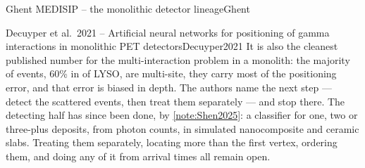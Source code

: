 \begin{programnote}{Ghent MEDISIP -- the monolithic detector lineage}{Ghent}
\begin{papernote}{Decuyper et al.\ 2021 -- Artificial neural networks for positioning of gamma interactions in monolithic PET detectors}{Decuyper2021}
It is also the cleanest published number for the multi-interaction problem in
a monolith: the majority of events, 60\% in  of LYSO, are
multi-site, they carry most of the positioning error, and that error is
biased in depth. The authors name the next step --- detect the scattered
events, then treat them separately --- and stop there. The detecting half has
since been done, by \ref{note:Shen2025}: a classifier for one, two or
three-plus deposits, from photon counts, in simulated nanocomposite and
ceramic slabs. Treating them separately, locating more than the first
vertex, ordering them, and doing any of it from arrival times all remain
open.

\end{papernote}

\end{programnote}



